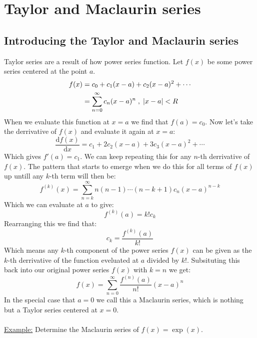 \documentclass[11pt, a4paper]{article}
\renewcommand*{\d}{\text{d}}
\numberwithin{equation}{section}
\numberwithin{figure}{section}
\begin{document}
\setcounter{section}{5}

\section{Taylor and Maclaurin series}

\subsection{Introducing the Taylor and Maclaurin series}
Taylor series are a result of how power series function. Let $f(x)$ be some power series centered at the point $a$.
\begin{align}
  f(x) &= c_0 + c_1(x-a) + c_2(x-a)^2 + \cdots \notag\\
       &= \sum_{n=0}^\infty c_n(x-a)^n\;,\;|x-a| < R
\end{align}
When we evaluate this function at $x=a$ we find that $f(a)=c_0$. Now let's take the derrivative of $f(x)$ and evaluate it again at $x=a$:
\begin{equation*}
  \frac{\d f(x)}{\d x} = c_1 + 2c_2(x-a) + 3c_3(x-a)^2 + \cdots
\end{equation*}
Which gives $f'(a)=c_1$. We can keep repeating this for any $n$-th derrivative of $f(x)$. The pattern that starts to emerge when we do this for all terms of $f(x)$ up untill any $k$-th term will then be:
\begin{equation}
  f^{(k)}(x)=\sum_{n=k}^\infty n(n-1)\cdots(n-k+1)c_n(x-a)^{n-k}
\end{equation}
Which we can evaluate at $a$ to give:
\begin{equation}
  f^{(k)}(a) = k!c_k
\end{equation}
Rearranging this we find that:
\begin{equation}
  c_k = \frac{f^{(k)}(a)}{k!}
\end{equation}
Which means any $k$-th component of the power series $f(x)$ can be given as the $k$-th derrivative of the function eveluated at $a$ divided by $k!$. Subsituting this back into our original power series $f(x)$ with $k=n$ we get:
\begin{equation}
  f(x) = \sum_{n=0}^\infty \frac{f^{(n)}(a)}{n!}(x-a)^n
\end{equation}
In the special case that $a = 0$ we call this a Maclaurin series, which is nothing but a Taylor series centered at $x=0$.\\
\\
\underline{Example:} Determine the Maclaurin series of $f(x) = \exp(x)$.
\end{document}

